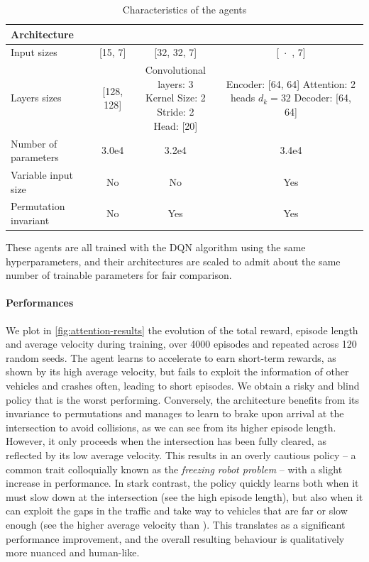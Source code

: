 \begin{table}[tp]
	\centering
	\begin{threeparttable}
		\caption{Characteristics of the agents}
		\label{tab:agents}
		\begin{tabular}{lccc}
			\toprule
			Architecture & \MLPL & \CNNG & \EgoAtt \\
			\midrule 
			Input sizes & [15, 7] & [32, 32, 7] & [~$\boldsymbol{\cdot}$~, 7] \\
			Layers sizes & [128, 128] &  \makecell[tc]{Convolutional layers: 3 \\ Kernel Size: 2 \\
				Stride: 2 \\ Head: [20]} & \makecell[tl]{Encoder: [64, 64] \\Attention: 2 heads\\\phantom{Attention: }$d_k=32$ \\ Decoder: [64, 64]} \\
			Number of parameters & 3.0e4 & 3.2e4 & 3.4e4 \\
			Variable input size & No & No &  {Yes}  \\
			Permutation invariant & No & {Yes} &  {Yes} \\
			\bottomrule
		\end{tabular}
	\end{threeparttable}
\end{table}

These agents are all trained with the DQN algorithm using the same hyperparameters, and their architectures are scaled to admit about the same number of trainable parameters for fair comparison.

\paragraph{Performances}

We plot in \autoref{fig:attention-results} the evolution of the total reward, episode length and average velocity during training, over 4000 episodes and repeated across 120 random seeds.
The \MLPL agent learns to accelerate to earn short-term rewards, as shown by its high average velocity, but fails to exploit the information of other vehicles and crashes often, leading to short episodes. We obtain a risky and blind policy that is the worst performing.
Conversely, the \CNNG architecture benefits from its invariance to permutations and manages to learn to brake upon arrival at the intersection to avoid collisions, as we can see from its higher episode length. However, it only proceeds when the intersection has been fully cleared, as reflected by its low average velocity. This results in an overly cautious policy -- a common trait colloquially known as the \emph{freezing robot problem} \citep{Trautman2010} -- with a slight increase in performance.
In stark contrast, the \EgoAtt policy quickly learns both when it must slow down at the intersection (see the high episode length), but also when it can exploit the gaps in the traffic and take way to vehicles that are far or slow enough (see the higher average velocity than \CNNG). This translates as a significant performance improvement, and the overall resulting behaviour is qualitatively more nuanced and human-like.

